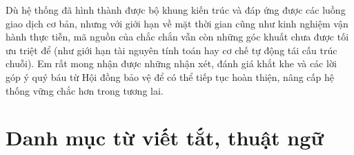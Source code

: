 \documentclass[12pt,a4paper]{article}
\begin{document}
Dù hệ thống đã hình thành được bộ khung kiến trúc và đáp ứng được các luồng giao dịch cơ bản, nhưng với giới hạn về mặt thời gian cũng như kinh nghiệm vận hành thực tiễn, mã nguồn của chắc chắn vẫn còn những góc khuất chưa được tối ưu triệt để (như giới hạn tài nguyên tính toán hay cơ chế tự động tái cấu trúc chuỗi). Em rất mong nhận được những nhận xét, đánh giá khắt khe và các lời góp ý quý báu từ Hội đồng bảo vệ để có thể tiếp tục hoàn thiện, nâng cấp hệ thống vững chắc hơn trong tương lai.

\newpage

\tableofcontents
\newpage
{}
\listoffigures

\newpage
{}
\listoftables
\newpage

\newpage
\section*{Danh mục từ viết tắt, thuật ngữ}
\end{document}
